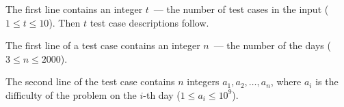 The first line contains an integer $t$~--- the number of test cases in the input ($1 \le t \le 10$). Then $t$ test case descriptions follow.

The first line of a test case contains an integer $n$~--- the number of the days ($3 \le n \le 2000$).

The second line of the test case contains $n$ integers $a_1, a_2, \dots, a_n$, where $a_i$ is the difficulty of the problem on the $i$-th day ($1 \le a_i \le 10^9$).
